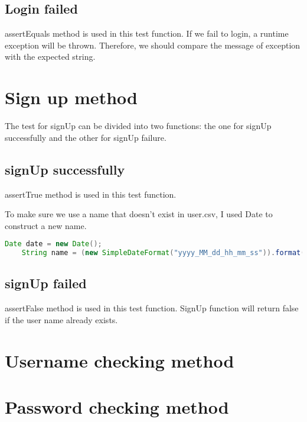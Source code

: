 \documentclass[a4paper]{report}
\begin{document}
\subsection{Login failed}
\par assertEquals method is used in this test function.  If we fail to login, a runtime exception will be thrown. Therefore, we should compare the message of exception with the expected string.

\section{Sign up method}
\par The test for signUp can be divided into two functions: the one for signUp successfully and the other for signUp failure.
\subsection{signUp successfully}
\par assertTrue method is used in this test function.
\par To make sure we use a name that doesn't exist in user.csv, I used Date to construct a new name.
\begin{lstlisting}[language=java]
    Date date = new Date();
    String name = (new SimpleDateFormat("yyyy_MM_dd_hh_mm_ss")).format(date);
\end{lstlisting}

\subsection{signUp failed}
\par assertFalse method is used in this test function. SignUp function will return false if the user name already exists.

\section{Username checking method}




\section{Password checking method}




\end{document}
